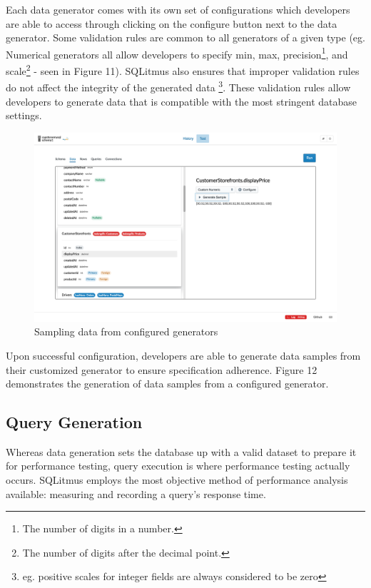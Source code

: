 \documentclass[12pt]{article}
\begin{document}
\begin{spacing}{1.9}
\begin{figure}[H]
		\end{figure}
		
		Each data generator comes with its own set of configurations which developers are able to access through clicking on the configure button next to the data generator. Some validation rules are common to all generators of a given type (eg. Numerical generators all allow developers to specify min, max, precision\footnote{The number of digits in a number.}, and scale\footnote{The number of digits after the decimal point.} - seen in Figure 11). SQLitmus also ensures that improper validation rules do not affect the integrity of the generated data \footnote{eg. positive scales for integer fields are always considered to be zero}. These validation rules allow developers to generate data that is compatible with the most stringent database settings.
		
		
		\begin{figure}[H]
			\centering
			\includegraphics[width=\textwidth]{3-2-2d.png}
			\caption{Sampling data from configured generators }
			
		\end{figure}
		
		Upon successful configuration, developers are able to generate data samples from their customized generator to ensure specification adherence. Figure 12 demonstrates the generation of data samples from a configured generator.
		
		\subsection{Query Generation}
		
		Whereas data generation sets the database up with a valid dataset to prepare it for performance testing, query execution is where performance testing actually occurs. SQLitmus employs the most objective method of performance analysis available: measuring and recording a query's response time.
		

\end{spacing}
\end{document}
